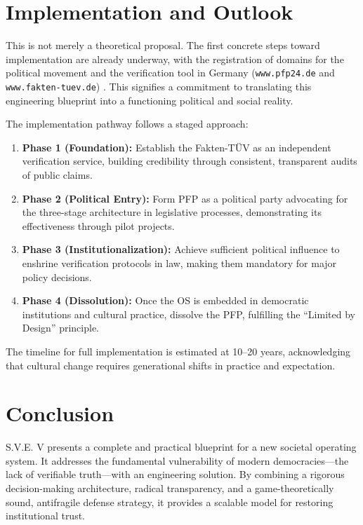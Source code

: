 \documentclass[11pt,a4paper]{article}
\begin{document}
\section{Implementation and Outlook}
This is not merely a theoretical proposal. The first concrete steps toward implementation are already underway, with the registration of domains for the political movement and the verification tool in Germany (\texttt{www.pfp24.de} and \texttt{www.fakten-tuev.de}) \citep{Kovnatsky2025PFP}. This signifies a commitment to translating this engineering blueprint into a functioning political and social reality.

The implementation pathway follows a staged approach:

\begin{enumerate}
    \item \textbf{Phase 1 (Foundation):} Establish the Fakten-TÜV as an independent verification service, building credibility through consistent, transparent audits of public claims.
    
    \item \textbf{Phase 2 (Political Entry):} Form PFP as a political party advocating for the three-stage architecture in legislative processes, demonstrating its effectiveness through pilot projects.
    
    \item \textbf{Phase 3 (Institutionalization):} Achieve sufficient political influence to enshrine verification protocols in law, making them mandatory for major policy decisions.
    
    \item \textbf{Phase 4 (Dissolution):} Once the OS is embedded in democratic institutions and cultural practice, dissolve the PFP, fulfilling the ``Limited by Design'' principle.
\end{enumerate}

The timeline for full implementation is estimated at 10--20 years, acknowledging that cultural change requires generational shifts in practice and expectation.

\section{Conclusion}
S.V.E. V presents a complete and practical blueprint for a new societal operating system. It addresses the fundamental vulnerability of modern democracies—the lack of verifiable truth—with an engineering solution. By combining a rigorous decision-making architecture, radical transparency, and a game-theoretically sound, antifragile defense strategy, it provides a scalable model for restoring institutional trust.
\end{document}
